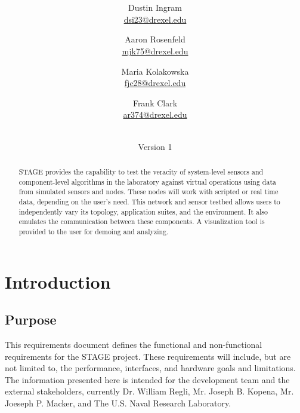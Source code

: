 \documentclass[titlepage]{article}
\title{\textbf{\mytitle}}
\author{
    Dustin Ingram \\\url{dsi23@drexel.edu}
    \and Aaron Rosenfeld \\\url{mjk75@drexel.edu}
    \and Maria Kolakowska \\\url{fjc28@drexel.edu}
    \and Frank Clark \\\url{ar374@drexel.edu}
}
\date{\mydate\\Version 1}
\begin{document}

\begin{figure}
    \vspace{-6em}
    \centering
    \vspace{-4em}
\end{figure}

\maketitle

\begin{abstract}
STAGE provides the capability to test the veracity of system-level sensors and component-level algorithms in the laboratory against virtual operations using data from simulated sensors and nodes. These nodes will work with scripted or real time data, depending on the user's need. This network and sensor testbed allows users to independently vary its topology, application suites, and the environment. It also emulates the communication between these components. A visualization tool is provided to the user for demoing and analyzing.
\end{abstract}

\setcounter{tocdepth}{4}
\tableofcontents
\pagebreak
{}



\section{Introduction%
  \label{introduction}%
}


\subsection{Purpose%
  \label{purpose}%
}

This requirements document defines the functional and non-functional requirements for the STAGE project.  These requirements will include, but are not limited to, the performance, interfaces, and hardware goals and limitations.  The information presented here is intended for the development team and the external stakeholders, currently Dr. William Regli, Mr. Joseph B. Kopena, Mr. Joeseph P. Macker, and The U.S. Naval Research Laboratory.
\end{document}
